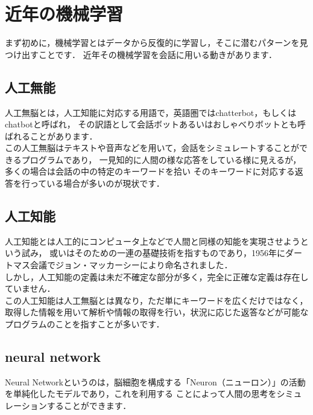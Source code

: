 
\section{近年の機械学習}
まず初めに，機械学習とはデータから反復的に学習し，そこに潜むパターンを見つけ出すことです．
近年その機械学習を会話に用いる動きがあります．
\\

\subsection{人工無能}
人工無脳\cite{muno}とは，人工知能に対応する用語で，英語圏ではchatterbot，もしくはchatbotと呼ばれ，
その訳語として会話ボットあるいはおしゃべりボットとも呼ばれることがあります．
\\
この人工無脳はテキストや音声などを用いて，会話をシミュレートすることができるプログラムであり，
一見知的に人間の様な応答をしている様に見えるが，多くの場合は会話の中の特定のキーワードを拾い
そのキーワードに対応する返答を行っている場合が多いのが現状です．
\\

\subsection{人工知能}
人工知能\cite{tino}とは人工的にコンピュータ上などで人間と同様の知能を実現させようという試み，
或いはそのための一連の基礎技術を指すものであり，1956年にダートマス会議でジョン・マッカーシーにより命名されました．
\\

しかし，人工知能の定義は未だ不確定な部分が多く，完全に正確な定義は存在していません．
\\

この人工知能は人工無脳とは異なり，ただ単にキーワードを広くだけではなく，
取得した情報を用いて解析や情報の取得を行い，状況に応じた返答などが可能なプログラムのことを指すことが多いです．
\\

\subsection{neural network}
Neural Networkというのは，脳細胞を構成する「Neuron（ニューロン）」の活動を単純化したモデルであり，これを利用する
ことによって人間の思考をシミュレーションすることができます．
\\

